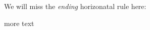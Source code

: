 \begin{pages}
\begin{Leftside}
\beginnumbering
\pstart
We will miss the \emph{ending}
horizonatal rule here:

\pend
\endnumbering
\end{Leftside}
\begin{Rightside}
\ledsectnotoc
\beginnumbering
\endnumbering
\end{Rightside}
\end{pages}
\Pages
more text

